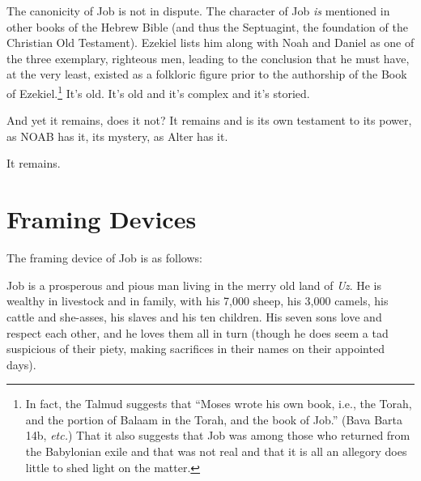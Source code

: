 The canonicity of Job is not in dispute. The character of Job \emph{is} mentioned in other books of the Hebrew Bible (and thus the Septuagint, the foundation of the Christian Old Testament). Ezekiel lists him along with Noah and Daniel as one of the three exemplary, righteous men, leading to the conclusion that he must have, at the very least, existed as a folkloric figure prior to the authorship of the Book of Ezekiel.\footnote{In fact, the Talmud suggests that ``Moses wrote his own book, i.e., the Torah, and the portion of Balaam in the Torah, and the book of Job.'' (Bava Barta 14b, \emph{etc.})\nocite{sefaria} That it also suggests that Job was among those who returned from the Babylonian exile and that was not real and that it is all an allegory does little to shed light on the matter.} It's old. It's old and it's complex and it's storied.

And yet it remains, does it not? It remains and is its own testament to its power, as NOAB has it, its mystery, as Alter has it.

It remains.

\section*{Framing Devices}

The framing device of Job is as follows:

Job is a prosperous and pious man living in the merry old land of \emph{Uz}. He is wealthy in livestock and in family, with his 7,000 sheep, his 3,000 camels, his cattle and she-asses, his slaves and his ten children. His seven sons love and respect each other, and he loves them all in turn (though he does seem a tad suspicious of their piety, making sacrifices in their names on their appointed days).

